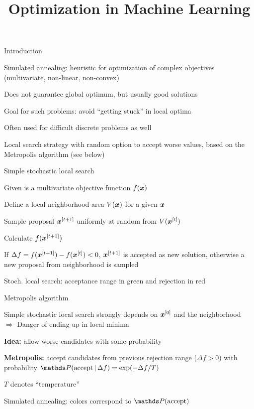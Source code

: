 \documentclass[11pt,compress,t,notes=noshow, xcolor=table]{beamer}
\title{Optimization in Machine Learning}
\begin{document}

\begin{framei}[fs=normalsize,sep=L]{Introduction}
\item Simulated annealing: heuristic for optimization of complex objectives\\ (multivariate, non-linear, non-convex)
\item Does not guarantee global optimum, but usually good solutions
\item Goal for such problems: avoid \enquote{getting stuck} in local optima
\item Often used for difficult discrete problems as well
\item Local search strategy with random option to accept worse values, based on the Metropolis algorithm (see below)
\end{framei}


\begin{framei}{Simple stochastic local search}
\item Given is a multivariate objective function $f(\bm{x})$
\item Define a local neighborhood area $V(\bm{x})$ for a given $\bm{x}$
\item Sample proposal $\bm{x}^{[t+1]}$ uniformly at random from $V(\bm{x}^{[t]})$
\item Calculate $f(\bm{x}^{[t+1]})$
\item If $\Delta f = f(\bm{x}^{[t+1]}) - f(\bm{x}^{[t]}) < 0$, $\bm{x}^{[t+1]}$ is accepted as new solution, otherwise a new proposal from neighborhood is sampled
\centerline{\footnotesize Stoch. local search: acceptance range in green and rejection in red}
\end{framei}


\begin{framei}{Metropolis algorithm}
\item Simple stochastic local search strongly depends on $\bm{x}^{[0]}$ and the neighborhood \\
$\Rightarrow$ Danger of ending up in local minima
\item \textbf{Idea:} allow worse candidates with some probability
\item \textbf{Metropolis:} accept candidates from previous rejection range ($\Delta f > 0$) with probability $\P(\text{accept} \,|\, \Delta f) = \exp(-\Delta f / T)$
\item $T$ denotes \enquote{temperature}
\centerline{\footnotesize Simulated annealing: colors correspond to $\P(\text{accept})$}
\end{framei}
\end{document}
